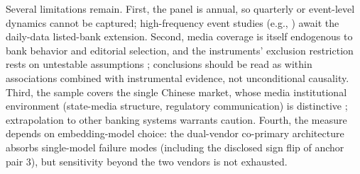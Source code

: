 Several limitations remain. First, the panel is annual, so quarterly
or event-level dynamics cannot be captured; high-frequency event
studies (e.g., ) await the daily-data listed-bank
extension. Second, media coverage is itself endogenous to bank
behavior and editorial selection, and the instruments' exclusion
restriction rests on untestable assumptions
\parencite{manski1993reflection,leary2014peer}; conclusions should be
read as within associations combined with instrumental evidence, not
unconditional causality. Third, the sample covers the single Chinese
market, whose media institutional environment (state-media structure,
regulatory communication) is distinctive \parencite{you2018pen};
extrapolation to other banking systems warrants caution. Fourth, the
measure depends on embedding-model choice: the dual-vendor co-primary
architecture absorbs single-model failure modes (including the
disclosed sign flip of anchor pair 3), but sensitivity beyond the two
vendors is not exhausted.

\printbibliography



